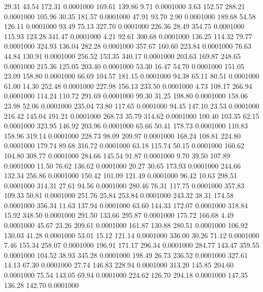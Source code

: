   29.31   43.54  172.31   0.0001000
 169.61  139.86    9.71   0.0001000
   3.63  152.57  288.21   0.0001000
 105.96   30.35  181.57   0.0001000
  47.91   93.70    2.90   0.0001000
 189.68   54.58  126.11   0.0001000
  93.49   75.13  327.70   0.0001000
 226.36   28.49  354.75   0.0001000
 115.93  123.28  341.47   0.0001000
   4.21   92.61  300.68   0.0001000
 136.25  114.32   79.77   0.0001000
 324.93  136.04  282.28   0.0001000
 357.67  160.60  223.84   0.0001000
  76.63   44.84  130.91   0.0001000
 256.52  153.35  340.17   0.0001000
 203.63  169.87  248.65   0.0001000
 215.36  125.05  203.40   0.0001000
  53.30   16.47   54.70   0.0001000
 151.05   23.09  158.80   0.0001000
  66.69  104.57  181.15   0.0001000
  94.38   65.11   80.51   0.0001000
  61.00   14.30  252.48   0.0001000
 227.98  156.13  233.50   0.0001000
   4.73  108.17  266.94   0.0001000
 114.24  110.72  291.69   0.0001000
  99.30   31.25  198.80   0.0001000
 158.06   23.98   52.06   0.0001000
 235.04   73.80  117.65   0.0001000
  94.45  147.10   23.53   0.0001000
 216.42  145.04  191.21   0.0001000
 268.73   35.79  314.62   0.0001000
 100.40  103.35   62.15   0.0001000
 323.95  146.92  203.96   0.0001000
  65.66   50.41  178.73   0.0001000
 110.83  158.96  319.14   0.0001000
 228.73   98.09  209.97   0.0001000
 168.24  108.81  224.80   0.0001000
 179.74   89.68  316.72   0.0001000
  63.18  115.74   50.15   0.0001000
 160.62  104.80  308.77   0.0001000
 284.66  145.54   91.87   0.0001000
   9.70   39.50  107.89   0.0001000
  11.50   76.62  136.62   0.0001000
  20.27   30.65  173.93   0.0001000
 244.66  132.34  256.86   0.0001000
 150.42  101.09  121.49   0.0001000
  96.42   10.63  298.51   0.0001000
 314.31   27.61   94.56   0.0001000
 280.46   76.31  117.75   0.0001000
 357.83  109.33   50.81   0.0001000
 251.76   25.84  253.84   0.0001000
 243.32   38.31  174.58   0.0001000
 356.34   11.63  137.94   0.0001000
  63.60  144.33  172.07   0.0001000
 318.84   15.92  348.50   0.0001000
 291.50  133.66  295.87   0.0001000
 175.72  166.68    4.49   0.0001000
  45.67   23.26  209.61   0.0001000
 161.87  130.88  280.51   0.0001000
 106.92  130.03   41.28   0.0001000
  53.01   15.12  121.14   0.0001000
 336.00   30.26   71.12   0.0001000
   7.46  155.34  258.07   0.0001000
 196.91  171.17  296.34   0.0001000
 284.77  143.47  359.55   0.0001000
 104.52   38.93  345.28   0.0001000
 198.49   26.73  236.52   0.0001000
 327.61   14.13   67.30   0.0001000
  27.74  146.83  228.94   0.0001000
 313.20  145.85  204.60   0.0001000
  75.54  143.05   69.94   0.0001000
 224.62  126.70  294.18   0.0001000
 147.35  136.28  142.70   0.0001000
